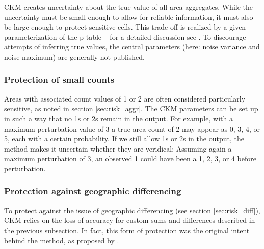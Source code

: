 CKM creates uncertainty about the true value of all area aggregates. While the uncertainty must be small enough to allow for reliable information, it must also be large enough to protect sensitive cells. This trade-off is realized by a given parameterization of the p-table -- for a detailed discussion see \cite[~ch.4]{Guidelines3_CensusDemog}. To discourage attempts of inferring true values, the central parameters (here: noise variance and noise maximum) are generally not published. 

\subsubsection{Protection of small counts}

Areas with associated count values of 1 or 2 are often considered particularly sensitive, as noted in section \ref{sec:risk_aggr}. The CKM parameters can be set up in such a way that no 1s or 2s remain in the output. For example, with a maximum perturbation value of 3 a true area count of 2 may appear as 0, 3, 4, or 5, each with a certain probability. If we still allow 1s or 2s in the output, the method makes it uncertain whether they are veridical: Assuming again a maximum perturbation of 3, an observed 1 could have been a 1, 2, 3, or 4 before perturbation.

\subsubsection{Protection against geographic differencing}

To protect against the issue of geographic differencing (see section \ref{sec:risk_diff}), CKM relies on the loss of accuracy for custom sums and differences described in the previous subsection. In fact, this form of protection was the original intent behind the method, as proposed by \cite{FraserWooton2005}.

